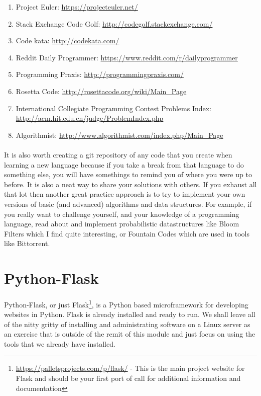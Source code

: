 \documentclass[12pt, a4paper, oneside]{book}
\begin{document}
\begin{enumerate}
\item Project Euler: \url{https://projecteuler.net/}
\item Stack Exchange Code Golf: \url{http://codegolf.stackexchange.com/}
\item Code kata: \url{http://codekata.com/}
\item Reddit Daily Programmer: \url{https://www.reddit.com/r/dailyprogrammer}
\item Programming Praxis: \url{http://programmingpraxis.com/}
\item Rosetta Code: \url{http://rosettacode.org/wiki/Main_Page}
\item International Collegiate Programming Contest Problems Index: \url{http://acm.hit.edu.cn/judge/ProblemIndex.php}
\item Algorithmist: \url{http://www.algorithmist.com/index.php/Main_Page}
\end{enumerate}

\paragraph{} It is also worth creating a git repository of any code that you create when learning a new language because if you take a break from that language to do something else, you will have somethings to remind you of where you were up to before. It is also a neat way to share your solutions with others. If you exhaust all that lot then another great practice approach is to try to implement your own versions of basic (and advanced) algorithms and data structures. For example, if you really want to challenge yourself, and your knowledge of a programming language, read about and implement probabilistic datastructures like Bloom Filters which I find quite interesting, or Fountain Codes which are used in tools like Bittorrent.

\section{Python-Flask}
\label{python-flask}
\paragraph{} Python-Flask, or just Flask\footnote{\url{https://palletsprojects.com/p/flask/} - This is the main project website for Flask and should be your first port of call for additional information and documentation}, is a Python based microframework for developing websites in Python. Flask is already installed and ready to run. We shall leave all of the nitty gritty of installing and administrating software on a Linux server as an exercise that is outside of the remit of this module and just focus on using the tools that we already have installed.
\end{document}
